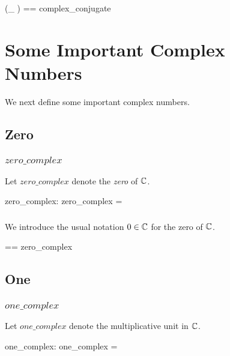 \documentclass{amsart}
\begin{document}
\begin{zed}
	(\_ \conjC) == complex\_conjugate
\end{zed}

\section{Some Important Complex Numbers}

We next define some important complex numbers.

\subsection{Zero}

\subsubsection{$zero\_complex$}

Let $zero\_complex$ denote the \textit{zero} of $\mathbb{C}$.

\begin{axdef}
	zero\_complex: \C
\where
	zero\_complex = \asRC \zeroR
\end{axdef}

\subsubsection{}

We introduce the usual notation $0 \in \mathbb{C}$ for the zero of $\mathbb{C}$.

\begin{zed}
	\zeroC == zero\_complex
\end{zed}

\subsection{One}

\subsubsection{$one\_complex$}

Let $one\_complex$ denote the multiplicative unit in $\mathbb{C}$.

\begin{axdef}
	one\_complex: \C
\where
	one\_complex = \asRC \oneR
\end{axdef}

\subsubsection{}
\end{document}
